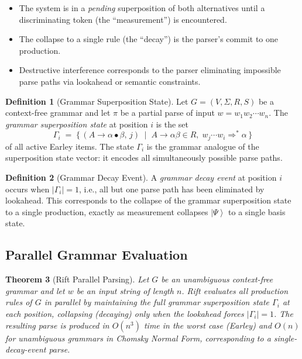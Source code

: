 \documentclass[12pt, a4paper]{article}
\theoremstyle{plain}
\newtheorem{theorem}{Theorem}[section]
\theoremstyle{definition}
\newtheorem{definition}[theorem]{Definition}
\theoremstyle{remark}
\newcommand{\ket}[1]{\left| #1 \right\rangle}
\begin{document}
\begin{itemize}
  \item The system is in a \emph{pending} superposition of both alternatives
        until a discriminating token (the ``measurement'') is encountered.
  \item The collapse to a single rule (the ``decay'') is the parser's commit
        to one production.
  \item Destructive interference corresponds to the parser eliminating
        impossible parse paths via lookahead or semantic constraints.
\end{itemize}

\begin{definition}[Grammar Superposition State]
  Let $G = (V, \Sigma, R, S)$ be a context-free grammar and let $\pi$ be a
  partial parse of input $w = w_1 w_2 \cdots w_n$.  The \emph{grammar
  superposition state} at position $i$ is the set
  \[
    \Gamma_i \;=\; \bigl\{\, (A \to \alpha \bullet \beta,\, j)
                   \;\mid\; A \to \alpha\beta \in R,\;
                   w_j \cdots w_i \Rightarrow^* \alpha \,\bigr\}
  \]
  of all active Earley items.  The state $\Gamma_i$ is the grammar analogue
  of the superposition state vector: it encodes all simultaneously possible
  parse paths.
\end{definition}

\begin{definition}[Grammar Decay Event]
  A \emph{grammar decay event} at position $i$ occurs when
  $|\Gamma_i| = 1$, i.e., all but one parse path has been eliminated by
  lookahead.  This corresponds to the collapse of the grammar superposition
  state to a single production, exactly as measurement collapses
  $\ket{\Psi}$ to a single basis state.
\end{definition}

\subsection{Parallel Grammar Evaluation}

\begin{theorem}[Rift Parallel Parsing]
  \label{thm:rift}
  Let $G$ be an unambiguous context-free grammar and let $w$ be an input
  string of length $n$.  Rift evaluates all production rules of $G$ in
  \emph{parallel} by maintaining the full grammar superposition state
  $\Gamma_i$ at each position, collapsing (decaying) only when the
  lookahead forces $|\Gamma_i| = 1$.  The resulting parse is produced in
  $O(n^3)$ time in the worst case (Earley) and $O(n)$ for unambiguous
  grammars in Chomsky Normal Form, corresponding to a single-decay-event
  parse.
\end{theorem}
\end{document}
